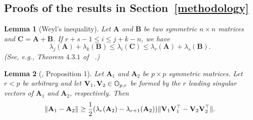 \documentclass[times,sort&compress,3p]{elsarticle}
\newcommand{\BA}{\mathbf{A}}    \newcommand{\BB}{\mathbf{B}}    \newcommand{\BC}{\mathbf{C}}    \newcommand{\BD}{\mathbf{D}}    \newcommand{\BE}{\mathbf{E}}    \newcommand{\BF}{\mathbf{F}}    \newcommand{\BG}{\mathbf{G}}    \newcommand{\BH}{\mathbf{H}}    \newcommand{\BI}{\mathbf{I}}    \newcommand{\BJ}{\mathbf{J}}    \newcommand{\BK}{\mathbf{K}}    \newcommand{\BL}{\mathbf{L}}
\theoremstyle{plain}
\newtheorem{corollary}{\quad\quad Corollary}
\newtheorem{lemma}{\quad\quad Lemma}
\theoremstyle{definition}
\theoremstyle{remark}
\begin{document}
\begin{appendices}
\section{Proofs of the results in Section~\ref{methodology}}\label{appendixB}

\begin{lemma}[Weyl's inequality]
Let $\BA$ and $\BB$ be two symmetric $n\times n$ matrices and $\BC=\BA+\BB$. If $r+s-1 \leq  i\leq j+k-n$, we have
\begin{equation*}
\lambda_j(\BA)+\lambda_k(\BB)\leq \lambda_i(\BC) \leq \lambda_r(\BA)+\lambda_s(\BB).
\end{equation*}
    (See, e.g., Theorem $4.3.1$ of ~\cite{Horn1985Matrix}.)
\end{lemma}

\begin{lemma}[\cite{Cai2015Optimal}, Proposition 1]\label{pert}
    Let $\BA_1$ and $\BA_2$ be $p\times p$ symmetric matrices. Let $r<p$ be arbitrary and let $\mathbf{V}_1, \mathbf{V}_2\in \mathbb{O}_{p,r}$ be formed by the $r$ leading singular vectors of $\BA_1$ and $\BA_2$, respectively.
    Then
    $$
    \|\BA_1-\BA_2\|\geq \frac{1}{2}(\lambda_r(\BA_2)-\lambda_{r+1}(\BA_2))\|\BV_1 \BV_1^\top - \BV_2 \BV_2^\top \|.
    $$
\end{lemma}



\end{appendices}
\end{document}
